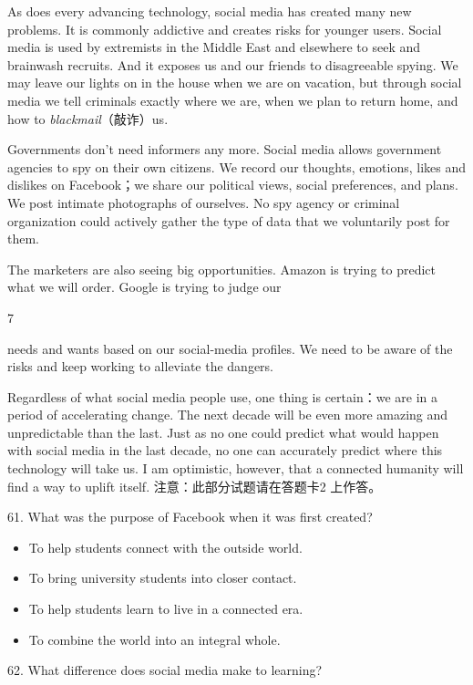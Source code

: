 \documentclass[UTF8,11pt]{ctexart}
\begin{document}
As does every advancing technology, social media has created many new problems. It is commonly addictive and creates risks for younger users. Social media is used by extremists in the Middle East and elsewhere to seek and brainwash recruits. And it exposes us and our friends to disagreeable spying. We may leave our lights on in the house when we are on vacation, but through social media we tell criminals exactly where we are, when we plan to return home, and how to\textit{ blackmail}（敲诈）us.


Governments don’t need informers any more. Social media allows government agencies to spy on their own citizens. We record our thoughts, emotions, likes and dislikes on Facebook；we share our political views, social preferences, and plans. We post intimate photographs of ourselves. No spy agency or criminal organization could actively gather the type of data that we voluntarily post for them.


The marketers are also seeing big opportunities. Amazon is trying to predict what we will order. Google is trying to judge our


7


needs and wants based on our social-media profiles. We need to be aware of the risks and keep working to alleviate the dangers.


Regardless of what social media people use, one thing is certain：we are in a period of accelerating change. The next decade will be even more amazing and unpredictable than the last. Just as no one could predict what would happen with social media in the last decade, no one can accurately predict where this technology will take us. I am optimistic, however, that a connected humanity will find a way to uplift itself. 注意：此部分试题请在答题卡2 上作答。


61. What was the purpose of Facebook when it was first created?


\begin{itemize}[leftmargin=2em,itemsep=.2em,topsep=.4em]\item[A.] To help students connect with the outside world.
\item[B.] To bring university students into closer contact.
\item[C.] To help students learn to live in a connected era.
\item[D.] To combine the world into an integral whole.
\end{itemize}

62. What difference does social media make to learning?
\end{document}
